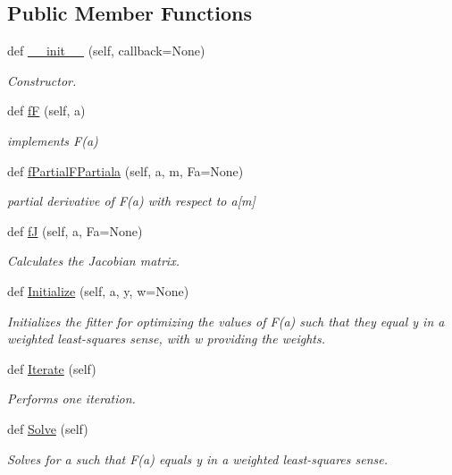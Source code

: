 \subsection*{Public Member Functions}
\begin{DoxyCompactItemize}
\item 
def \hyperlink{classSignalIntegrity_1_1Fit_1_1LevMar_1_1LevMar_a5580a7fcf0bfd317a8f8c7c80eefdd69}{\+\_\+\+\_\+init\+\_\+\+\_\+} (self, callback=None)
\begin{DoxyCompactList}\small\item\em Constructor. \end{DoxyCompactList}\item 
def \hyperlink{classSignalIntegrity_1_1Fit_1_1LevMar_1_1LevMar_a4657ab652abd49c90e9541299fa5e9d8}{fF} (self, a)
\begin{DoxyCompactList}\small\item\em implements F(a) \end{DoxyCompactList}\item 
def \hyperlink{classSignalIntegrity_1_1Fit_1_1LevMar_1_1LevMar_a2cb2f2f3d90e9eff6180a5b6a5ffa5cc}{f\+Partial\+F\+Partiala} (self, a, m, Fa=None)
\begin{DoxyCompactList}\small\item\em partial derivative of F(a) with respect to a\mbox{[}m\mbox{]} \end{DoxyCompactList}\item 
def \hyperlink{classSignalIntegrity_1_1Fit_1_1LevMar_1_1LevMar_a5852efb9aab8530b863efac8008cd425}{fJ} (self, a, Fa=None)
\begin{DoxyCompactList}\small\item\em Calculates the Jacobian matrix. \end{DoxyCompactList}\item 
def \hyperlink{classSignalIntegrity_1_1Fit_1_1LevMar_1_1LevMar_a9959e9bb037bdf52fad0a1af157ec0ce}{Initialize} (self, a, y, w=None)
\begin{DoxyCompactList}\small\item\em Initializes the fitter for optimizing the values of F(a) such that they equal y in a weighted least-\/squares sense, with w providing the weights. \end{DoxyCompactList}\item 
def \hyperlink{classSignalIntegrity_1_1Fit_1_1LevMar_1_1LevMar_ac4e956c4e88489e4e3f11d7fde09d613}{Iterate} (self)
\begin{DoxyCompactList}\small\item\em Performs one iteration. \end{DoxyCompactList}\item 
def \hyperlink{classSignalIntegrity_1_1Fit_1_1LevMar_1_1LevMar_acfa2263d4f73bf98053a5a8ed10a4c41}{Solve} (self)
\begin{DoxyCompactList}\small\item\em Solves for a such that F(a) equals y in a weighted least-\/squares sense. \end{DoxyCompactList}\end{DoxyCompactItemize}
